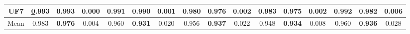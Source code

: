\begin{table*}[t]
\begin{tabular}{c c|c|c|c|c|c|c|c|c|c|c|c|c|c|c}
\multicolumn{1}{c|}{UF7} & {\ul 0.993} & \textbf{0.993} & 0.000 & 0.991 & 0.990 & 0.001 & 0.980 & 0.976 & 0.002 & 0.983 & 0.975 & 0.002 & 0.992 & 0.982 & 0.006 \\ \hline
\multicolumn{1}{c|}{Mean} & 0.983 & \textbf{0.976} & 0.004 & 0.960 & \textbf{0.931} & 0.020 & 0.956 & \textbf{0.937} & 0.022 & 0.948 & \textbf{0.934} & 0.008 & 0.960 & \textbf{0.936} & 0.028 \\ \hline
\end{tabular}%
\end{table*}

